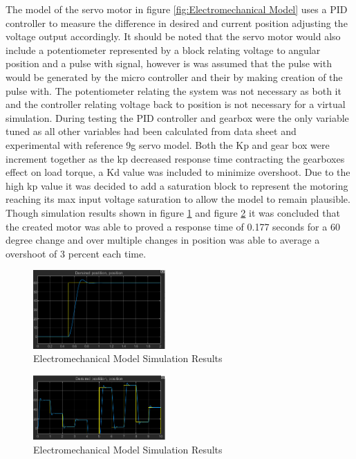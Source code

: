 The model of the servo motor in figure \ref{fig:Electromechanical Model} uses a PID controller to measure the difference in desired and current position adjusting the voltage output accordingly. It should be noted that the servo motor would also include a potentiometer represented by a block relating voltage to angular position and a pulse with signal, however is was assumed that the pulse with would be generated by the micro controller and their by making creation of the pulse with. The potentiometer relating the system was not necessary as both it and the controller relating voltage back to position is not necessary for a virtual simulation. During testing the PID controller and gearbox were the only variable tuned as all other variables had been calculated from data sheet and experimental with reference 9g servo model. Both the Kp and gear box were increment together as the kp decreased response time contracting the gearboxes effect on load torque, a Kd value was included to minimize overshoot. Due to the high kp value it was decided to add a saturation block to represent the motoring reaching its max input voltage saturation to allow the model to remain plausible. Though simulation results shown in figure \ref{fig:Electromechanical Model Simulation Results} and figure \ref{fig:Electromechanical Model Simulation varying input positions}  it was concluded that the created motor was able to proved a response time of 0.177 seconds for a 60 degree change and over multiple changes in position was able to average a overshoot of 3 percent each time. 
\begin{figure}[h]
 \centering
   \includegraphics[width = 0.45\textwidth]{figures/15.png}                \caption{Electromechanical Model Simulation Results}
   \label{fig:Electromechanical Model Simulation Results}
\end{figure}
\begin{figure}[h]
 \centering
   \includegraphics[width = 0.45\textwidth]{figures/16.png}                \caption{Electromechanical Model Simulation Results}
   \label{fig:Electromechanical Model Simulation varying input positions}
\end{figure}





